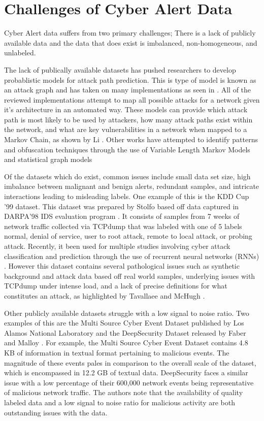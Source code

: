 \documentclass[12pt,american]{report}
\begin{document}
\section{Challenges of Cyber Alert Data}
Cyber Alert data suffers from two primary challenges; There is a lack of publicly available data and the data that does exist is imbalanced, non-homogeneous, and unlabeled. 

The lack of publically available datasets has pushed researchers to develop probablistic models for attack path prediction. This is type of model is known as an attack graph and has taken on many implementations as seen in \cite{Qin2004, Wang2006, Noel2009}. All of the reviewed implementations attempt to map all possible attacks for a network given it's architecture in an automated way. These models can provide which attack path is most likely to be used by attackers, how many attack paths exist within the network, and what are key vulnerabilities in a network when mapped to a Markov Chain, as shown by Li \cite{Li2017}. Other works have attempted to identify patterns and obfuscation techniques through the use of Variable Length Markov Models \cite{Fava2008} and statistical graph models \cite{Du2014}


Of the datasets which do exist, common issues include small data set size, high imbalance between malignant and benign alerts, redundant samples, and intricate interactions leading to misleading labels. One example of this is the KDD Cup '99 \cite{kdd-cup} dataset. This dataset was prepared by Stolfo \etal \cite{Stolfo} based off data captured in DARPA'98 IDS evaluation program \cite{Lippmann}. It consists of samples from 7 weeks of network traffic collected via TCPdump that was labeled with one of 5 labels {normal, denial of service, user to root attack, remote to local attack, or probing attack}. Recently, it been used for multiple studies involving cyber attack classification and prediction through the use of recurrent neural networks (RNNs) \cite{Kim, Staudemeyer}. However this dataset contains several pathological issues such as synthetic background and attack data based off real world samples, underlying issues with TCPdump under intense load, and a lack of precise definitions for what constitutes an attack, as highlighted by Tavallaee \etal \cite{Tavallaee} and McHugh \cite{McHugh}.

Other publicly available datasets struggle with a low signal to noise ratio. Two examples of this are the Multi Source Cyber Event Dataset published by Los Alamos National Laboratory \cite{akent-2015-enterprise-data} and the DeepSecurity Dataset released by Faber and Malloy \cite{Faber2018}. For example, the Multi Source Cyber Event Dataset contains 4.8 KB of information in textual format pertaining to malicious events. The magnitude of these events pales in comparison to the overall scale of the dataset, which is encompassed in  12.2 GB of textual data. DeepSecurity faces a similar issue with a low percentage of their 600,000 network events being representative of malicious network traffic. The authors note that the availability of quality labeled data and a low signal to noise ratio for malicious activity are both outstanding issues with the data. 
\end{document}
